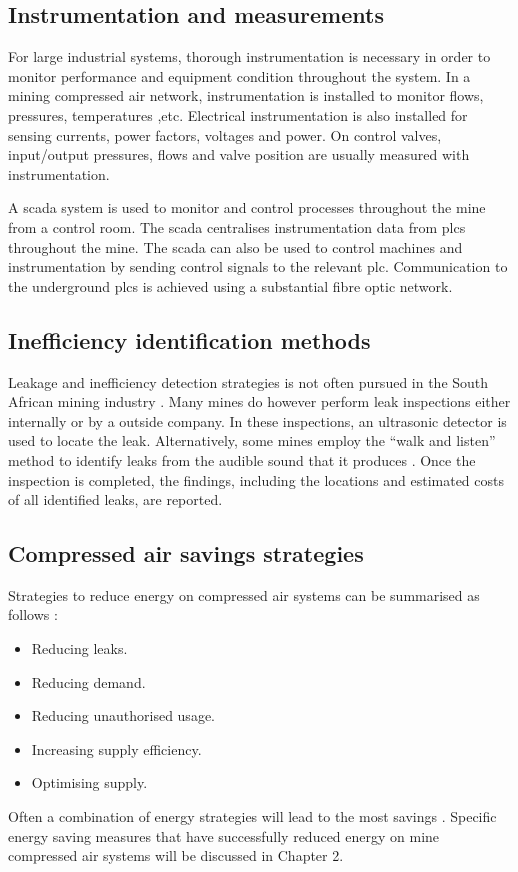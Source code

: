 		\subsection{Instrumentation and measurements}
		For large industrial systems, thorough instrumentation is necessary in order to monitor performance and equipment condition throughout the system. In a mining compressed air network, instrumentation is installed to monitor flows, pressures, temperatures ,etc. Electrical instrumentation is also installed for sensing currents, power factors, voltages and power. On control valves, input/output pressures, flows and valve position are usually measured with instrumentation.	
		\par
		 A \gls{scada} system is used to monitor and control processes throughout the mine from a control room. The \gls{scada} centralises instrumentation data from \glspl{plc} throughout the mine. The \gls{scada} can also be used to control machines and instrumentation by sending control signals to the relevant \gls{plc}.  Communication to the underground \glspl{plc} is achieved using a substantial fibre optic network.\cite{schroeder2009energy}

	\subsection{Inefficiency identification methods}
		Leakage and inefficiency detection strategies is not often pursued in the South African mining industry \cite{vanTonder2010Masters}. Many mines do however perform leak inspections either internally or by a outside company. In these inspections, an ultrasonic detector is used to locate the leak. Alternatively, some mines employ the \enquote{walk and listen} method to identify leaks from the audible sound that it produces \cite{vanTonder2010Masters}. Once the inspection is completed, the findings, including the locations and estimated costs of all identified leaks, are reported.
	\subsection{Compressed air savings strategies}
		Strategies to reduce energy on compressed air systems can be summarised as follows \cite{Snyman2011Masters}:
		\begin{itemize}
			\item Reducing leaks.
			\item Reducing demand.
			\item Reducing unauthorised usage.
			\item Increasing supply efficiency.
			\item Optimising supply.
		\end{itemize}
	Often a combination of energy strategies will lead to the most savings \cite{Marais2012PhD}. Specific energy saving measures that have successfully reduced energy on mine compressed air systems will be discussed in Chapter 2.
